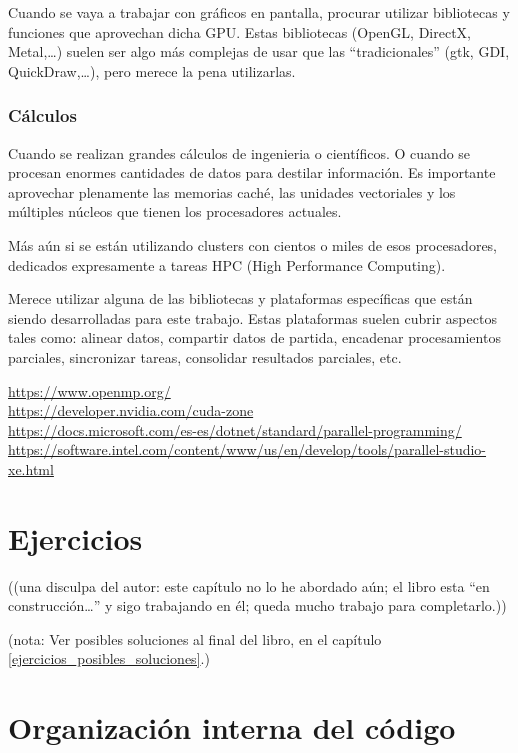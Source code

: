 \documentclass[spanish,12pt,a4paper,final,oneside]{book}
\begin{document}
Cuando se vaya a trabajar con gráficos en pantalla, procurar utilizar bibliotecas y funciones que aprovechan dicha GPU. Estas bibliotecas (OpenGL, DirectX, Metal,\ldots) suelen ser algo más complejas de usar que las ``tradicionales'' (gtk, GDI, QuickDraw,\ldots), pero merece la pena utilizarlas.


\subsection{Cálculos}
Cuando se realizan grandes cálculos de ingenieria o científicos. O cuando se procesan enormes cantidades de datos para destilar información. Es importante aprovechar plenamente las memorias caché, las unidades vectoriales y los múltiples núcleos que tienen los procesadores actuales. 

Más aún si se están utilizando clusters con cientos o miles de esos procesadores, dedicados expresamente a tareas HPC (High Performance Computing). 

Merece utilizar alguna de las bibliotecas y plataformas específicas que están siendo desarrolladas para este trabajo. Estas plataformas suelen cubrir aspectos tales como: alinear datos, compartir datos de partida, encadenar procesamientos parciales, sincronizar tareas, consolidar resultados parciales, etc.

\url{https://www.openmp.org/}
\\ \url{https://developer.nvidia.com/cuda-zone}
\\ \url{https://docs.microsoft.com/es-es/dotnet/standard/parallel-programming/}
\\ \url{https://software.intel.com/content/www/us/en/develop/tools/parallel-studio-xe.html}


\chapter{Ejercicios}\label{ejercicios_paralelismo}

\begin{footnotesize}((una disculpa del autor: este capítulo no lo he abordado aún; el libro esta ``en construcción\ldots'' y sigo trabajando en él; queda mucho trabajo para completarlo.))\end{footnotesize}

(nota: Ver posibles soluciones al final del libro, en el capítulo \ref{ejercicios_posibles_soluciones}.)\\


\chapter{Organización interna del código}
\end{document}
